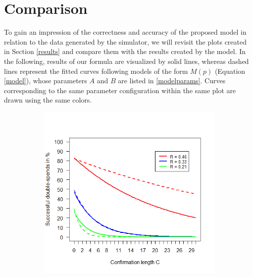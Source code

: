 \documentclass[a4paper,12pt,twoside]{report}
\begin{document}
\section{Comparison}
To gain an impression of the correctness and accuracy of the proposed model in relation to the data generated by the simulator, we will revisit the plots created in Section \ref{results} and compare them with the results created by the model. In the following, results of our formula are visualized by solid lines, whereas dashed lines represent the fitted curves following models of the form $M(p)$ (Equation \ref{model}), whose parameters $A$ and $B$ are listed in \autoref{modelparams}. Curves corresponding to the same parameter configuration within the same plot are drawn using the same colors.
\begin{figure}
\centering
\begin{subfigure}{.495\textwidth}
  \centering
  \includegraphics[width=\linewidth]{Comparison/Confirmations/conf.png}
\end{subfigure}
\begin{subfigure}{.495\textwidth}
  \centering

\end{subfigure}
\end{figure}
\end{document}
